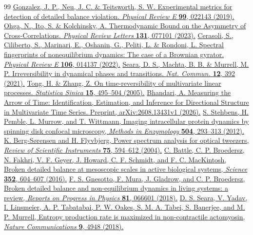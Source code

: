 \begin{thebibliography}{99}
 \href{https://doi.org/10.1103/PhysRevE.99.022143}{Gonzalez, J. P., Neu, J. C. \& Teitsworth, S. W. Experimental metrics for detection of detailed balance violation. \emph{Physical Review E} \textbf{99}, 022143 (2019).}
 \href{https://doi.org/10.1103/PhysRevLett.131.077101}{Ohga, N., Ito, S. \& Kolchinsky, A.
Thermodynamic Bound on the Asymmetry of Cross-Correlations.
\emph{Physical Review Letters} \textbf{131}, 077101 (2023).}
 \href{https://doi.org/10.1103/PhysRevE.106.014137}{Cerasoli, S., Ciliberto, S., Marinari, E., Oshanin, G., Peliti, L. \& Rondoni, L.
Spectral fingerprints of nonequilibrium dynamics: The case of a Brownian gyrator.
\emph{Physical Review E} \textbf{106}, 014137 (2022).}
 \href{https://doi.org/10.1038/s41467-020-20281-2}{Seara, D. S., Machta, B. B. \& Murrell, M. P. Irreversibility in dynamical phases and transitions. \emph{Nat. Commun.} \textbf{12}, 392 (2021).}
 \href{https://www3.stat.sinica.edu.tw/statistica/oldpdf/A15n210.pdf}{Tong, H. \& Zhang, Z. On time-reversibility of multivariate linear processes. \emph{Statistica Sinica} \textbf{15}, 495--504 (2005).}
 \href{https://arxiv.org/abs/2608.13431v1}{Bhandari, A. Measuring the Arrow of Time: Identification, Estimation, and Inference for Directional Structure in Multivariate Time Series. Preprint, arXiv:2608.13431v1 (2026).}
 \href{https://doi.org/10.1016/B978-0-12-391857-4.00015-X}{S. Stehbens, H. Pemble, L. Murrow, and T. Wittmann, Imaging intracellular protein dynamics by spinning disk confocal microscopy, \emph{Methods in Enzymology} \textbf{504}, 293--313 (2012).}
 \href{https://doi.org/10.1063/1.1645654}{K. Berg-S\o rensen and H. Flyvbjerg, Power spectrum analysis for optical tweezers, \emph{Review of Scientific Instruments} \textbf{75}, 594--612 (2004).}
 \href{https://doi.org/10.1126/science.aac8167}{C. Battle, C. P. Broedersz, N. Fakhri, V. F. Geyer, J. Howard, C. F. Schmidt, and F. C. MacKintosh, Broken detailed balance at mesoscopic scales in active biological systems, \emph{Science} \textbf{352}, 604--607 (2016).}
 \href{https://doi.org/10.1088/1361-6633/aab3ed}{F. S. Gnesotto, F. Mura, J. Gladrow, and C. P. Broedersz, Broken detailed balance and non-equilibrium dynamics in living systems: a review, \emph{Reports on Progress in Physics} \textbf{81}, 066601 (2018).}
 \href{https://doi.org/10.1038/s41467-018-07413-5}{D. S. Seara, V. Yadav, I. Linsmeier, A. P. Tabatabai, P. W. Oakes, S. M. A. Tabei, S. Banerjee, and M. P. Murrell, Entropy production rate is maximized in non-contractile actomyosin, \emph{Nature Communications} \textbf{9}, 4948 (2018).}

\end{thebibliography}
